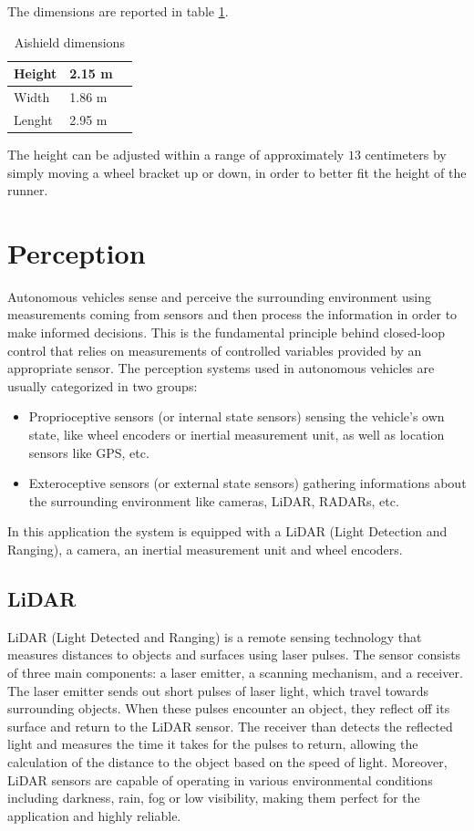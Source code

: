 \documentclass[a4paper,12pt,oneside]{book}
\begin{document}
The dimensions are reported in table \ref{tab:Shield_dimensions}.
\begin{table}[h]
\centering
\begin{tabular}{|p{1.5cm}|p{1.5cm}|p{1.5cm}|}
\hline
Height & 2.15 m \\
\hline
Width & 1.86 m \\
\hline
Lenght & 2.95 m \\
\hline
\end{tabular}
\caption{Aishield dimensions}
\label{tab:Shield_dimensions}
\end{table}
The height can be adjusted within a range of approximately $13$ centimeters by simply moving a wheel bracket up or down, in order to better fit the height of the runner.

\section{Perception}
Autonomous vehicles sense and perceive the surrounding environment using measurements coming from sensors and then process the information in order to make informed decisions. 
This is the fundamental principle behind closed-loop control that relies on measurements of controlled variables provided by an appropriate sensor.
The perception systems used in autonomous vehicles are usually categorized in two groups:
\begin{itemize}
    \item Proprioceptive sensors (or internal state sensors) sensing the vehicle's own state, like wheel encoders or inertial measurement unit, as well as location sensors like GPS, etc.
    \item Exteroceptive sensors (or external state sensors) gathering informations about the surrounding environment like cameras, LiDAR, RADARs, etc.
\end{itemize}
In this application the system is equipped with a LiDAR (Light Detection and Ranging), a camera, an inertial measurement unit and wheel encoders.

\subsection*{LiDAR}
LiDAR (Light Detected and Ranging) is a remote sensing technology that measures distances to objects and surfaces using laser pulses. 
The sensor consists of three main components: a laser emitter, a scanning mechanism, and a receiver.
The laser emitter sends out short pulses of laser light, which travel towards surrounding objects. 
When these pulses encounter an object, they reflect off its surface and return to the LiDAR sensor.
The receiver than detects the reflected light and measures the time it takes for the pulses to return, allowing the calculation of the distance to the object based on the speed of light.
Moreover, LiDAR sensors are capable of operating in various environmental conditions including darkness, rain, fog or low visibility, making them perfect for the application and highly reliable.
\end{document}
